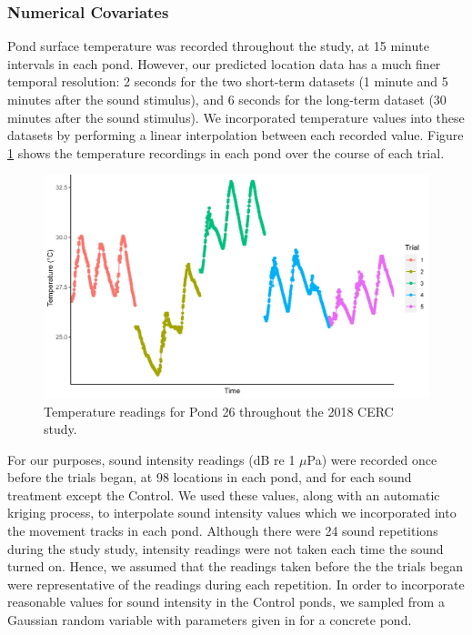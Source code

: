 \documentclass[12pt]{article}
\begin{document}
	\subsubsection{Numerical Covariates} \label{sec:num-cov}
	
	Pond surface temperature was recorded throughout the study, at 15 minute intervals in each pond. However, our predicted location data has a much finer temporal resolution: 2 seconds for the two short-term datasets (1 minute and 5 minutes after the sound stimulus), and 6 seconds for the long-term dataset (30 minutes after the sound stimulus). We incorporated temperature values into these datasets by performing a linear interpolation between each recorded value. Figure \ref{img:temperature} shows the temperature recordings in each pond over the course of each trial.
	
	\begin{figure}
		\includegraphics[width=\textwidth]{pond_26_temp.png}
		\caption{Temperature readings for Pond 26 throughout the 2018 CERC study.}
		\label{img:temperature}
	\end{figure}
	
	For our purposes, sound intensity readings (dB re 1 $\mu$Pa) were recorded once before the trials began, at 98 locations in each pond, and for each sound treatment except the Control. We used these values, along with an automatic kriging process, to interpolate sound intensity values which we incorporated into the movement tracks in each pond. Although there were 24 sound repetitions during the study study, intensity readings were not taken each time the sound turned on. Hence, we assumed that the readings taken before the the trials began were representative of the readings during each repetition. In order to incorporate reasonable values for sound intensity in the Control ponds, we sampled from a Gaussian random variable with parameters given in \cite{Wysocki2007} for a concrete pond.
	
\end{document}
